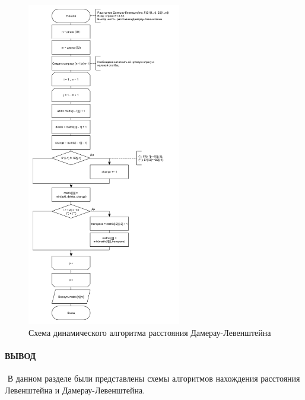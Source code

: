 \begin{figure}[h]
    \centering
    \includegraphics[width=0.6\textwidth]{images/d_lev_dyn.jpg}
    \caption{Схема динамического алгоритма расстояния Дамерау-Левенштейна}
    \label{fig:images-ddyn-lev}
\end{figure}

\clearpage

\paragraph*{ВЫВОД} ${}$ \newline
В данном разделе были представлены схемы алгоритмов нахождения расстояния Левенштейна и
Дамерау-Левенштейна.


\clearpage
